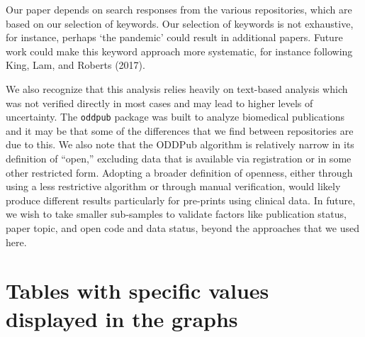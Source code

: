 \documentclass[
]{article}
\begin{document}
Our paper depends on search responses from the various repositories, which are based on our selection of keywords. Our selection of keywords is not exhaustive, for instance, perhaps `the pandemic' could result in additional papers. Future work could make this keyword approach more systematic, for instance following King, Lam, and Roberts (2017).

We also recognize that this analysis relies heavily on text-based analysis which was not verified directly in most cases and may lead to higher levels of uncertainty. The \texttt{oddpub} package was built to analyze biomedical publications and it may be that some of the differences that we find between repositories are due to this. We also note that the ODDPub algorithm is relatively narrow in its definition of ``open,'' excluding data that is available via registration or in some other restricted form. Adopting a broader definition of openness, either through using a less restrictive algorithm or through manual verification, would likely produce different results particularly for pre-prints using clinical data. In future, we wish to take smaller sub-samples to validate factors like publication status, paper topic, and open code and data status, beyond the approaches that we used here.

\newpage

\hypertarget{appendix-appendix}{%
\appendix}


\hypertarget{tables-with-specific-values-displayed-in-the-graphs}{%
\section{Tables with specific values displayed in the graphs}\label{tables-with-specific-values-displayed-in-the-graphs}}
\end{document}
